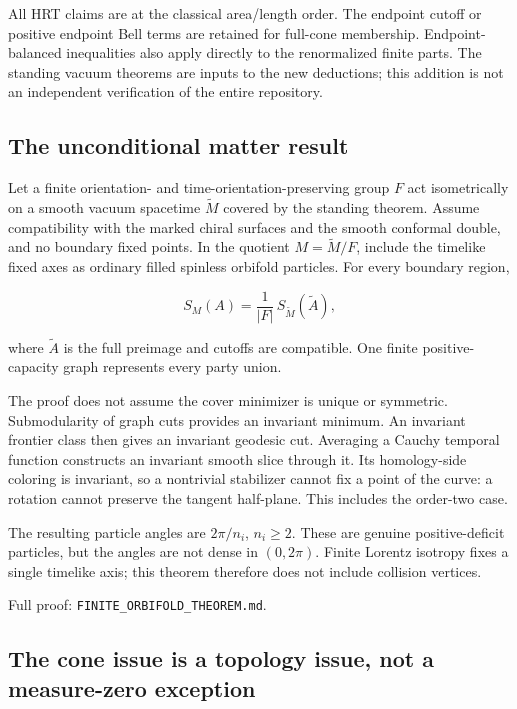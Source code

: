 \documentclass[11pt]{article}
\begin{document}
All HRT claims are at the classical area/length order. The endpoint
cutoff or positive endpoint Bell terms are retained for full-cone
membership. Endpoint-balanced inequalities also apply directly to the
renormalized finite parts. The standing vacuum theorems are inputs to
the new deductions; this addition is not an independent verification of
the entire repository.

\subsection{The unconditional matter
result}\label{the-unconditional-matter-result}

Let a finite orientation- and time-orientation-preserving group \(F\)
act isometrically on a smooth vacuum spacetime \(\widetilde M\) covered
by the standing theorem. Assume compatibility with the marked chiral
surfaces and the smooth conformal double, and no boundary fixed points.
In the quotient \(M=\widetilde M/F\), include the timelike fixed axes as
ordinary filled spinless orbifold particles. For every boundary region,

\[
S_M(A)=\frac{1}{|F|}\,S_{\widetilde M}(\widetilde A),
\]

where \(\widetilde A\) is the full preimage and cutoffs are compatible.
One finite positive-capacity graph represents every party union.

The proof does not assume the cover minimizer is unique or symmetric.
Submodularity of graph cuts provides an invariant minimum. An invariant
frontier class then gives an invariant geodesic cut. Averaging a Cauchy
temporal function constructs an invariant smooth slice through it. Its
homology-side coloring is invariant, so a nontrivial stabilizer cannot
fix a point of the curve: a rotation cannot preserve the tangent
half-plane. This includes the order-two case.

The resulting particle angles are \(2\pi/n_i\), \(n_i\ge2\). These are
genuine positive-deficit particles, but the angles are not dense in
\((0,2\pi)\). Finite Lorentz isotropy fixes a single timelike axis; this
theorem therefore does not include collision vertices.

Full proof: \texttt{FINITE\_\allowbreak ORBIFOLD\_\allowbreak THEOREM.md}.

\subsection{The cone issue is a topology issue, not a measure-zero
exception}\label{the-cone-issue-is-a-topology-issue-not-a-measure-zero-exception}
\end{document}
